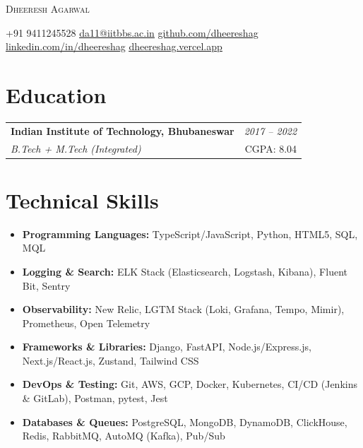 \documentclass[letterpaper, 10pt]{article}
\makeatletter
\newcommand{\myhref}[2]{\href{#1}{\color{accent}\underline{#2}}}
\newcommand{\eduEntry}[4]{%
  \begin{tabular*}{\textwidth}[t]{l@{\extracolsep{\fill}}r}
    \textbf{#1} & \small\textit{#3} \\[-1pt]
    \textit{\small #2} & \small #4
  \end{tabular*}%
  \vspace{-3pt}%
}
\makeatother
\begin{document}
\begin{center}
  {\Huge\scshape\color{accent} Dheeresh Agarwal} 

  \vspace{3pt}

  \small
  +91 9411245528
  \quad{\color{rulecolor}\textbar}\quad
  \myhref{mailto:da11@iitbbs.ac.in}{da11@iitbbs.ac.in}
  \quad{\color{rulecolor}\textbar}\quad
  \myhref{https://github.com/dheereshag}{github.com/dheereshag}
  \quad{\color{rulecolor}\textbar}\quad
  \myhref{https://linkedin.com/in/dheereshag}{linkedin.com/in/dheereshag}
  \quad{\color{rulecolor}\textbar}\quad
  \myhref{https://dheereshag.vercel.app}{dheereshag.vercel.app}
\end{center}

\vspace{-6pt} 

\section{Education}

\eduEntry%
  {Indian Institute of Technology, Bhubaneswar}%
  {B.Tech + M.Tech (Integrated)}%
  {2017 -- 2022}%
  {CGPA: 8.04}

\section{Technical Skills}
\begin{itemize}[leftmargin=0pt, label={}, topsep=2.5pt, itemsep=1.2pt]
  \item \textbf{Programming Languages:} TypeScript/JavaScript, Python, HTML5, SQL, MQL
  \item \textbf{Logging \& Search:} ELK Stack (Elasticsearch, Logstash, Kibana), Fluent Bit, Sentry
    \item \textbf{Observability:} New Relic, LGTM Stack (Loki, Grafana, Tempo, Mimir), Prometheus, Open Telemetry
  \item \textbf{Frameworks \& Libraries:} Django, FastAPI, Node.js/Express.js, Next.js/React.js, Zustand, Tailwind CSS

  \item \textbf{DevOps \& Testing:} Git, AWS, GCP, Docker, Kubernetes, CI/CD (Jenkins \& GitLab), Postman, pytest, Jest

    \item \textbf{Databases \& Queues:} PostgreSQL, MongoDB, DynamoDB, ClickHouse, Redis, RabbitMQ, AutoMQ (Kafka), Pub/Sub
\end{itemize}
\end{document}
